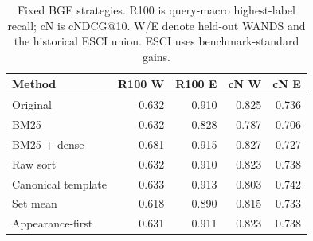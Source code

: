 \begin{table}[t]
\caption{Fixed BGE strategies. R100 is query-macro highest-label recall; cN is cNDCG@10. W/E denote held-out WANDS and the historical ESCI union. ESCI uses benchmark-standard gains.}
\label{tab:recall_main}
\centering\small
\begin{tabular}{lrrrr}\toprule
Method & R100 W & R100 E & cN W & cN E\\\midrule
Original & 0.632 & 0.910 & 0.825 & 0.736\\
BM25 & 0.632 & 0.828 & 0.787 & 0.706\\
BM25 + dense & 0.681 & 0.915 & 0.827 & 0.727\\
Raw sort & 0.632 & 0.910 & 0.823 & 0.738\\
Canonical template & 0.633 & 0.913 & 0.803 & 0.742\\
Set mean & 0.618 & 0.890 & 0.815 & 0.733\\
Appearance-first & 0.631 & 0.911 & 0.823 & 0.738\\
\bottomrule\end{tabular}
\end{table}
